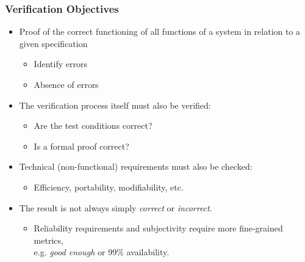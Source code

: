 
\begin{frame}
\frametitle{Verification Objectives}
\begin{itemize}
  \item Proof of the correct functioning of all functions of a system in relation to a given specification
    \begin{itemize}
      \item Identify errors
      \item Absence of errors
    \end{itemize}
  \item The verification process itself must also be verified: 
    \begin{itemize}
      \item Are the test conditions correct?
      \item Is a formal proof correct? 
    \end{itemize}
  \item Technical (non-functional) requirements must also be checked:
    \begin{itemize}
      \item Efficiency, portability, modifiability, etc.
    \end{itemize}
  \item The result is not always simply \emph{correct} or \emph{incorrect}.
    \begin{itemize}
      \item Reliability requirements and subjectivity require more fine-grained metrics,\\
      e.g. \emph{good enough} or 99\% availability.
    \end{itemize}
\end{itemize}
\end{frame}




